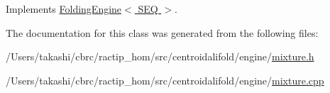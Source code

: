 Implements \hyperlink{class_folding_engine_a314c78e5fe35d5a1b5f441604c58e8f1}{Folding\+Engine$<$ S\+E\+Q $>$}.



The documentation for this class was generated from the following files\+:\begin{DoxyCompactItemize}
\item 
/\+Users/takashi/cbrc/ractip\+\_\+hom/src/centroidalifold/engine/\hyperlink{mixture_8h}{mixture.\+h}\item 
/\+Users/takashi/cbrc/ractip\+\_\+hom/src/centroidalifold/engine/\hyperlink{mixture_8cpp}{mixture.\+cpp}\end{DoxyCompactItemize}
